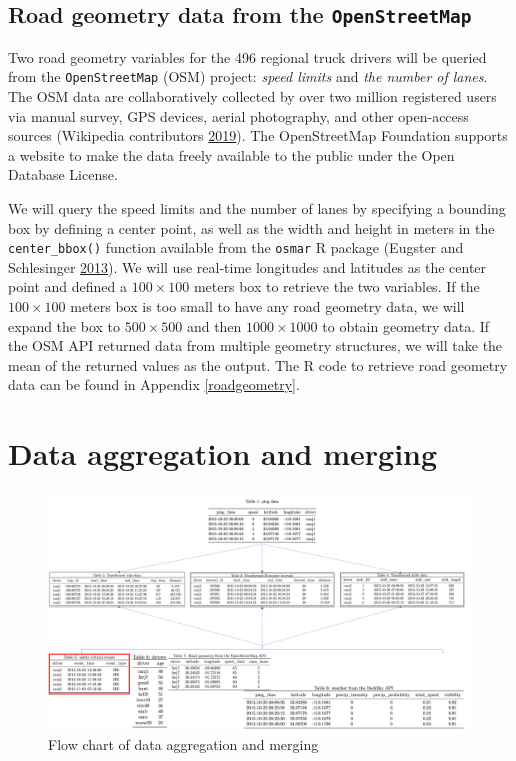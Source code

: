\documentclass[12pt]{book}
\numberwithin{equation}{chapter}
\begin{document}
\hypertarget{road-geometry-data-from-the-openstreetmap}{%
\subsection{\texorpdfstring{Road geometry data from the \texttt{OpenStreetMap}}{Road geometry data from the OpenStreetMap}}\label{road-geometry-data-from-the-openstreetmap}}

Two road geometry variables for the 496 regional truck drivers will be queried from the \texttt{OpenStreetMap} (OSM) project: \emph{speed limits} and \emph{the number of lanes}.
The OSM data are collaboratively collected by over two million registered users via manual survey, GPS devices, aerial photography, and other open-access sources (Wikipedia contributors \protect\hyperlink{ref-wikiOSM}{2019}).
The OpenStreetMap Foundation supports a website to make the data freely available to the public under the Open Database License.

We will query the speed limits and the number of lanes by specifying a bounding box by defining a center point, as well as the width and height in meters in the \texttt{center\_bbox()} function available from the \texttt{osmar} R package (Eugster and Schlesinger \protect\hyperlink{ref-eugster2013osmar}{2013}).
We will use real-time longitudes and latitudes as the center point and defined a \(100\times100\) meters box to retrieve the two variables.
If the \(100\times100\) meters box is too small to have any road geometry data, we will expand the box to \(500\times500\) and then \(1000\times1000\) to obtain geometry data.
If the OSM API returned data from multiple geometry structures, we will take the mean of the returned values as the output.
The R code to retrieve road geometry data can be found in Appendix \ref{roadgeometry}.

\hypertarget{data-aggregation-and-merging}{%
\section{Data aggregation and merging}\label{data-aggregation-and-merging}}

\begin{figure}

{\centering \includegraphics[width=\linewidth]{figs/Data_merging} 

}

\caption{Flow chart of data aggregation and merging}\label{fig:unnamed-chunk-1}
\end{figure}
\end{document}
